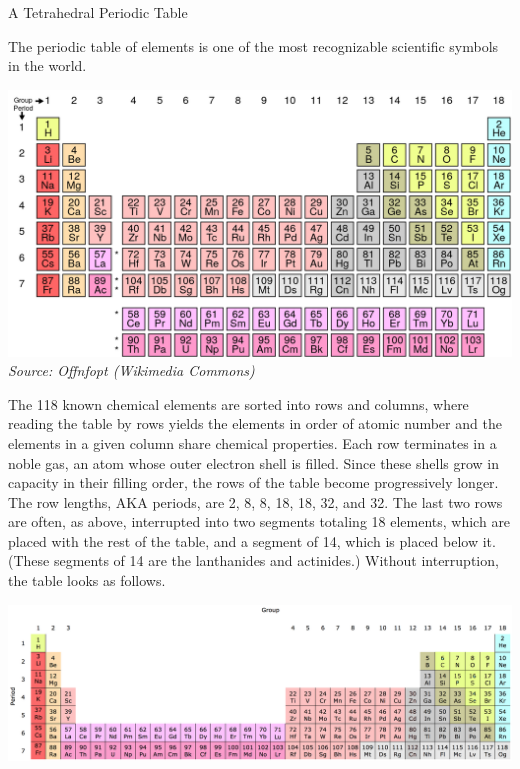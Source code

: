 \documentclass{article}
\begin{document}
\begin{center}
  A Tetrahedral Periodic Table
\end{center}

The periodic table of elements is one of the most recognizable scientific symbols in the world.

\begin{center}
  \includegraphics[width=\linewidth]{normal.png}
  \textit{Source: Offnfopt (Wikimedia Commons)}
\end{center}

The 118 known chemical elements are sorted into rows and columns,
where reading the table by rows yields the elements in order of atomic number
and the elements in a given column share chemical properties.
Each row terminates in a noble gas,
an atom whose outer electron shell is filled.
Since these shells grow in capacity in their filling order,
the rows of the table become progressively longer.
The row lengths, AKA periods, are 2, 8, 8, 18, 18, 32, and 32.
The last two rows are often, as above, interrupted
into two segments totaling 18 elements, which are placed with the rest of the table,
and a segment of 14, which is placed below it.
(These segments of 14 are the lanthanides and actinides.)
Without interruption, the table looks as follows.

\begin{center}
  \includegraphics[width=\linewidth]{long.png}
\end{center}
\end{document}
